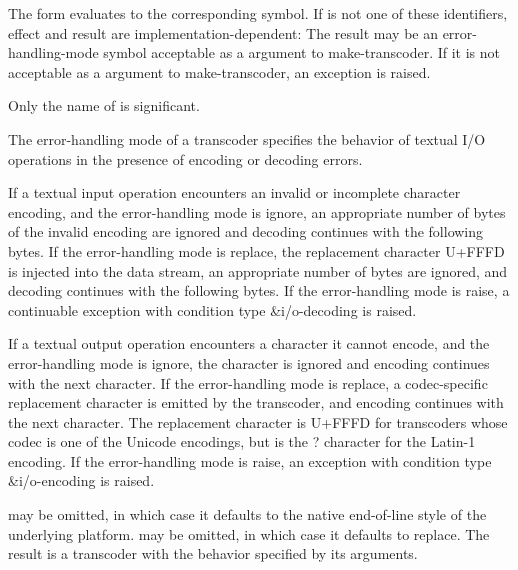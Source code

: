 \begin{entry}{%
}

 The
form evaluates to the corresponding symbol.  If
 is not one of these identifiers,
effect and result are implementation-dependent: The result may be an
error-handling-mode symbol acceptable as a 
argument to {\cf make-transcoder}.  If it is not acceptable as a
 argument to {\cf make-transcoder}, an exception is
raised.

\begin{note}
  Only the name of  is significant.
\end{note}

The error-handling mode of a transcoder specifies the behavior
of textual I/O operations in the presence of encoding or decoding
errors.

If a textual input operation encounters an invalid or incomplete
character encoding, and the error-handling mode is {\cf ignore},
an appropriate number of bytes of the
invalid encoding are ignored and decoding continues with the
following bytes.
If the error-handling mode is {\cf replace}, the replacement
character U+FFFD is injected into the data stream, an appropriate
number of bytes are ignored, and decoding
continues with the following bytes.
If the error-handling mode is {\cf raise}, a continuable
exception with condition type {\cf\&i/o-decoding} is raised.

If a textual output operation encounters a character it cannot encode,
and the error-handling mode is {\cf ignore}, the character is
ignored and encoding continues with the next character.
If the error-handling mode is {\cf replace}, a codec-specific
replacement character is emitted by the transcoder, and encoding
continues with the next character.
The replacement character is U+FFFD for transcoders whose codec
is one of the Unicode encodings, but is the {\cf ?}
character for the Latin-1 encoding.
If the error-handling mode is {\cf raise}, an
exception with condition type {\cf\&i/o-encoding} is raised.
\end{entry}

\begin{entry}{%
}

   may be omitted, in
which case it defaults to the native end-of-line style of the
underlying platform.   may be omitted, in which
case it defaults to {\cf replace}.  The result is a transcoder with the
behavior specified by its arguments.
\end{entry}

